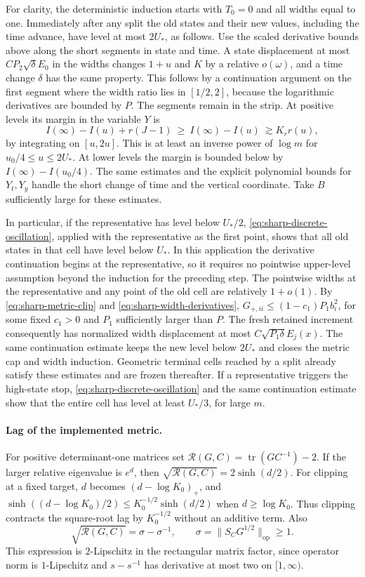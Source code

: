 \documentclass[11pt]{article}
\newcommand{\1}{\mathbf{1}}
\numberwithin{equation}{section}
\newcommand{\tr}{\operatorname{tr}}
\begin{document}
For clarity, the deterministic induction starts with
\(T_0=0\) and all widths equal to one. Immediately after any
split the old states and their new values, including the
time advance, have level at most \(2U_*\), as follows.
Use the scaled derivative bounds above along the short
segments in state and time. A state displacement at most
\(C P_2\sqrt\delta E_0\) in the widths changes \(1+u\) and
\(K\) by a relative \(o(\omega)\), and a time change \(\delta\)
has the same property. This follows by a continuation
argument on the first segment where the width ratio lies
in \([1/2,2]\), because the logarithmic derivatives are
bounded by \(P\). The segments remain in the strip.
At positive levels its margin in the variable \(Y\) is
\[
 I(\infty)-I(u)+r(J-1)\ \ge\ I(\infty)-I(u)
 \ \gtrsim K_r r(u),
\]
by integrating on \([u,2u]\). This is at least an inverse power
of \(\log m\) for \(u_0/4\le u\le 2U_*\).
At lower levels the margin is bounded below by
\(I(\infty)-I(u_0/4)\). The same estimates and the explicit
polynomial bounds for \(Y_t,Y_y\) handle the short change
of time and the vertical coordinate. Take \(B\) sufficiently
large for these estimates.

In particular, if the representative has level below \(U_*/2\),
\eqref{eq:sharp-discrete-oscillation}, applied with the
representative as the first point, shows that all old
states in that cell have level below \(U_*\). In this
application the derivative continuation begins at the
representative, so it requires no pointwise upper-level
assumption beyond the induction for the preceding step.
The pointwise widths at the representative and any point
of the old cell are relatively \(1+o(1)\).
By \eqref{eq:sharp-metric-clip} and \eqref{eq:sharp-width-derivatives},
\(G_{+,ii}\le (1-c_1)P_1 b_i^2\), for some fixed \(c_1>0\)
and \(P_1\) sufficiently larger than \(P\).
The fresh retained increment consequently has normalized
width displacement at most \(C\sqrt{P_1\delta}E_j(x)\).
The same continuation estimate keeps the new level below
\(2U_*\) and closes the metric cap and width induction.
Geometric terminal cells reached by a split already satisfy
these estimates and are frozen thereafter. If a representative
triggers the high-state stop, \eqref{eq:sharp-discrete-oscillation}
and the same continuation estimate show that the entire cell
has level at least \(U_*/3\), for large \(m\).

\paragraph{Lag of the implemented metric.}
For positive determinant-one matrices set
\(\mathcal R(G,C)=\tr(GC^{-1})-2\).
If the larger relative eigenvalue is \(e^d\), then
\(\sqrt{\mathcal R(G,C)}=2\sinh(d/2)\).
For clipping at a fixed target, \(d\) becomes
\((d-\log K_0)_+\), and
\(\sinh((d-\log K_0)/2)\le K_0^{-1/2}\sinh(d/2)\)
when \(d\ge\log K_0\). Thus clipping contracts the
square-root lag by \(K_0^{-1/2}\) without an additive term.
Also
\[
 \sqrt{\mathcal R(G,C)}=\sigma-\sigma^{-1},
 \qquad \sigma=\|S_CG^{1/2}\|_{\mathrm{op}}\ge1.
\]
This expression is \(2\)-Lipschitz in the rectangular matrix
factor, since operator norm is \(1\)-Lipschitz and
\(s-s^{-1}\) has derivative at most two on \([1,\infty)\).
\end{document}
